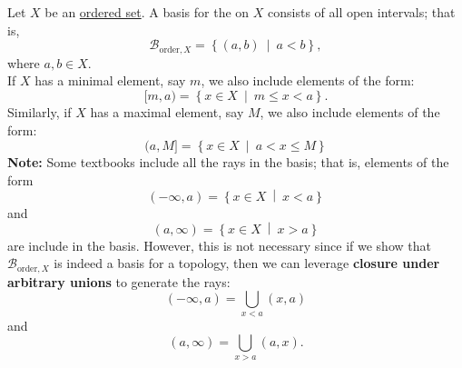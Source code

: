 \begin{dfn}\label{def:basis-for-order-topology}
    Let \( X \) be an \hyperref[def:order-on-a-set]{ordered set}. A basis for the  on \( X \) consists of all open intervals; that is, 
    \[ \mathscr{B}_{\mathrm{order},X} = \left\{ \left( a,b \right)\ \middle| \ a<b \right\} ,\]
    where \( a,b \in X \). \\ 
    If \( X \) has a minimal element, say \( m \), we also include elements of the form:
    \[ [m,a) = \left\{ x \in X \ \middle| \ m \le x <a \right\} .\] 
    Similarly, if \( X \) has a maximal element, say \( M \), we also include elements of the form: 
    \[ (a,M] = \left\{ x \in X \ \middle| \ a< x \le M\right\}   \]
  \textbf{Note: } Some textbooks include all the rays in the basis; that is, elements of the form 
  \[ \left( - \infty, a \right) = \left\{ x \in X \ \middle| \ x < a \right\} \]  
  and 
  \[ \left( a, \infty \right) = \left\{ x \in X \ \middle| \ x > a \right\} \]
  are include in the basis. However, this is not necessary since if we show that \( \mathscr{B}_{\mathrm{order},X} \) is indeed a basis for a topology, then we can leverage \textbf{closure under arbitrary unions} to generate the rays: 
  \[ \left( - \infty, a \right) = \bigcup_{x < a} \left( x,a \right) \]
  and 
  \[ \left( a, \infty \right) = \bigcup_{x > a} \left( a,x \right) . \]
\end{dfn}

